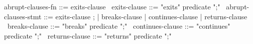 \begin{syntax}
  abrupt-clauses-fn ::= exits-clause
  \
  exits-clause ::= {"exits" predicate ";"}
  \
  abrupt-clauses-stmt ::= exits-clause ;
        | breaks-clause | continues-clause | returns-clause
  \
  breaks-clause ::= {"breaks" predicate ";"}
  \
  continues-clause ::= {"continues" predicate ";"}
  \
  returns-clause ::= {"returns" predicate ";"}
\end{syntax}